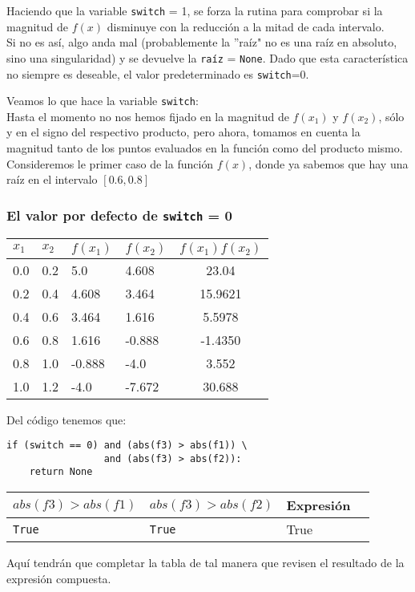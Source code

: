 \begin{frame}
Haciendo que la variable \texttt{switch} = 1, se forza la rutina para comprobar si la magnitud de $f(x)$ disminuye con la reducción a la mitad de cada intervalo.
\\
\medskip
Si no es así, algo anda mal (probablemente la ''raíz" no es una raíz en absoluto, sino una singularidad) y se devuelve la \texttt{raíz} = \texttt{None}. Dado que esta característica no siempre es deseable, el valor predeterminado es \texttt{switch}=0.
\end{frame}
\begin{frame}
Veamos lo que hace la variable \texttt{switch}:
\\
\medskip
Hasta el momento no nos hemos fijado en la magnitud de $f(x_{1})$ y $f(x_{2})$, sólo y en el signo del respectivo producto, pero ahora, tomamos en cuenta la magnitud tanto de los puntos evaluados en la función como del producto mismo.
\\
\medskip
Consideremos le primer caso de la función $f(x)$, donde ya sabemos que hay una raíz en el intervalo $[0.6,0.8]$
\end{frame}
\begin{frame}[fragile]
\frametitle{El valor por defecto de \texttt{switch} = 0}
\begin{tabular}{l | l | l | l | c}
$x_{1}$ & $x_{2}$ & $f(x_{1})$ & $f(x_{2})$ & $f(x_{1})f(x_{2})$ \\ \hline
0.0 & 0.2 & 5.0 & 4.608 & 23.04 \\ \hline
0.2 & 0.4 & 4.608 & 3.464 & 15.9621 \\ \hline
0.4 & 0.6 & 3.464 & 1.616 & 5.5978 \\ \hline
0.6 & 0.8 & 1.616 & -0.888 & -1.4350 \\ \hline
0.8 & 1.0 & -0.888 & -4.0 & 3.552 \\ \hline
1.0 & 1.2 & -4.0 & -7.672 & 30.688
\end{tabular}
\end{frame}
\begin{frame}[fragile]
Del código tenemos que:
\begin{verbatim}
if (switch == 0) and (abs(f3) > abs(f1)) \ 
                 and (abs(f3) > abs(f2)):
    return None
\end{verbatim}
\begin{tabular}{l  l | l | l}
$abs(f3) > abs(f1)$ & $abs(f3) > abs(f2)$ & Expresión \\ \hline
\texttt{True} & \texttt{True} & True \\ \hline

\end{tabular}
Aquí tendrán que completar la tabla de tal manera que revisen el resultado de la expresión compuesta.
\end{frame}
